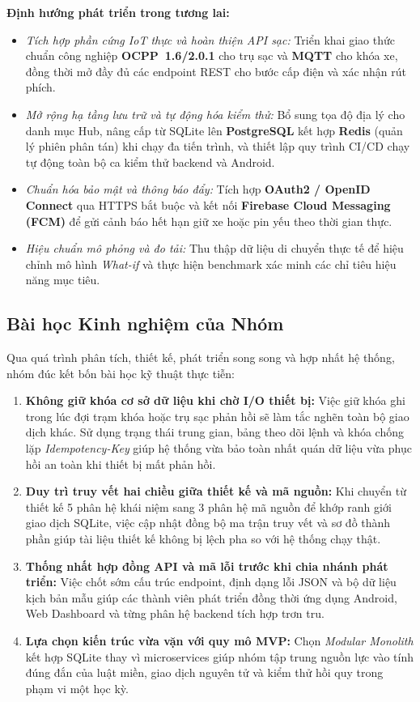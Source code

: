 \noindent\textbf{Định hướng phát triển trong tương lai:}
\begin{itemize}[leftmargin=*,nosep]
    \item \textit{Tích hợp phần cứng IoT thực và hoàn thiện API sạc:} Triển khai giao thức chuẩn công nghiệp \textbf{OCPP~1.6/2.0.1} cho trụ sạc và \textbf{MQTT} cho khóa xe, đồng thời mở đầy đủ các endpoint REST cho bước cấp điện và xác nhận rút phích.
    \item \textit{Mở rộng hạ tầng lưu trữ và tự động hóa kiểm thử:} Bổ sung tọa độ địa lý cho danh mục Hub, nâng cấp từ SQLite lên \textbf{PostgreSQL} kết hợp \textbf{Redis} (quản lý phiên phân tán) khi chạy đa tiến trình, và thiết lập quy trình CI/CD chạy tự động toàn bộ ca kiểm thử backend và Android.
    \item \textit{Chuẩn hóa bảo mật và thông báo đẩy:} Tích hợp \textbf{OAuth2 / OpenID Connect} qua HTTPS bắt buộc và kết nối \textbf{Firebase Cloud Messaging (FCM)} để gửi cảnh báo hết hạn giữ xe hoặc pin yếu theo thời gian thực.
    \item \textit{Hiệu chuẩn mô phỏng và đo tải:} Thu thập dữ liệu di chuyển thực tế để hiệu chỉnh mô hình \textit{What-if} và thực hiện benchmark xác minh các chỉ tiêu hiệu năng mục tiêu.
\end{itemize}

\subsection{Bài học Kinh nghiệm của Nhóm}

Qua quá trình phân tích, thiết kế, phát triển song song và hợp nhất hệ thống, nhóm đúc kết bốn bài học kỹ thuật thực tiễn:

\begin{enumerate}[leftmargin=*,nosep]
    \item \textbf{Không giữ khóa cơ sở dữ liệu khi chờ I/O thiết bị:} Việc giữ khóa ghi trong lúc đợi trạm khóa hoặc trụ sạc phản hồi sẽ làm tắc nghẽn toàn bộ giao dịch khác. Sử dụng trạng thái trung gian, bảng theo dõi lệnh và khóa chống lặp \textit{Idempotency-Key} giúp hệ thống vừa bảo toàn nhất quán dữ liệu vừa phục hồi an toàn khi thiết bị mất phản hồi.
    \item \textbf{Duy trì truy vết hai chiều giữa thiết kế và mã nguồn:} Khi chuyển từ thiết kế 5 phân hệ khái niệm sang 3 phân hệ mã nguồn để khớp ranh giới giao dịch SQLite, việc cập nhật đồng bộ ma trận truy vết và sơ đồ thành phần giúp tài liệu thiết kế không bị lệch pha so với hệ thống chạy thật.
    \item \textbf{Thống nhất hợp đồng API và mã lỗi trước khi chia nhánh phát triển:} Việc chốt sớm cấu trúc endpoint, định dạng lỗi JSON và bộ dữ liệu kịch bản mẫu giúp các thành viên phát triển đồng thời ứng dụng Android, Web Dashboard và từng phân hệ backend tích hợp trơn tru.
    \item \textbf{Lựa chọn kiến trúc vừa vặn với quy mô MVP:} Chọn \textit{Modular Monolith} kết hợp SQLite thay vì microservices giúp nhóm tập trung nguồn lực vào tính đúng đắn của luật miền, giao dịch nguyên tử và kiểm thử hồi quy trong phạm vi một học kỳ.
\end{enumerate}
